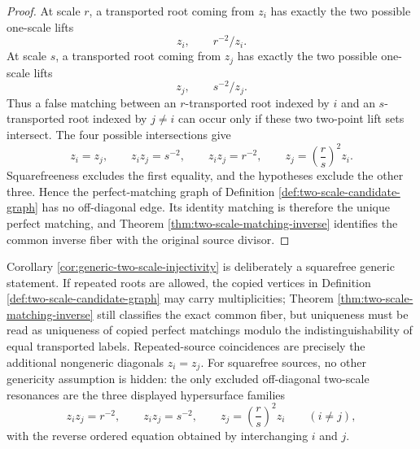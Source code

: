 \begin{proof}
At scale \(r\), a transported root coming from \(z_i\) has exactly the
two possible one-scale lifts
\[
z_i,\qquad r^{-2}/z_i .
\]
At scale \(s\), a transported root coming from \(z_j\) has exactly the
two possible one-scale lifts
\[
z_j,\qquad s^{-2}/z_j .
\]
Thus a false matching between an \(r\)-transported root indexed by
\(i\) and an \(s\)-transported root indexed by \(j\ne i\) can occur
only if these two two-point lift sets intersect.  The four possible
intersections give
\[
z_i=z_j,\qquad z_i z_j=s^{-2},\qquad
z_i z_j=r^{-2},\qquad
z_j=\left(\frac r s\right)^2z_i .
\]
Squarefreeness excludes the first equality, and the hypotheses exclude
the other three.  Hence the perfect-matching graph of Definition
\ref{def:two-scale-candidate-graph} has no off-diagonal edge.  Its
identity matching is therefore the unique perfect matching, and Theorem
\ref{thm:two-scale-matching-inverse} identifies the common inverse
fiber with the original source divisor.
\end{proof}

\begin{remark}\label{rem:two-scale-repeated-root-caveat}
Corollary \ref{cor:generic-two-scale-injectivity} is deliberately a
squarefree generic statement.  If repeated roots are allowed, the
copied vertices in Definition \ref{def:two-scale-candidate-graph} may
carry multiplicities; Theorem \ref{thm:two-scale-matching-inverse}
still classifies the exact common fiber, but uniqueness must be read
as uniqueness of copied perfect matchings modulo the
indistinguishability of equal transported labels.  Repeated-source
coincidences are precisely the additional nongeneric diagonals
\(z_i=z_j\).  For squarefree sources, no other genericity assumption
is hidden: the only excluded off-diagonal two-scale resonances are
the three displayed hypersurface families
\[
z_i z_j=r^{-2},\qquad
z_i z_j=s^{-2},\qquad
z_j=\left(\frac r s\right)^2z_i
\qquad (i\ne j),
\]
with the reverse ordered equation obtained by interchanging \(i\) and
\(j\).
\end{remark}

